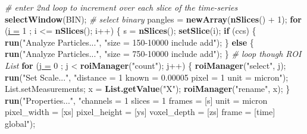 \documentclass[11pt,singlespacinge,twoside]{reedthesis} %
\newenvironment{Shaded}{}{}
\newcommand{\CommentTok}[1]{\textit{#1}}
\newcommand{\ControlFlowTok}[1]{\textbf{#1}}
\newcommand{\DataTypeTok}[1]{\underline{#1}}
\newcommand{\DecValTok}[1]{#1}
\newcommand{\KeywordTok}[1]{\textbf{#1}}
\newcommand{\NormalTok}[1]{#1}
\newcommand{\OperatorTok}[1]{#1}
\newcommand{\StringTok}[1]{#1}
\theoremstyle{definition}
\theoremstyle{definition}
\theoremstyle{definition}
\theoremstyle{remark}
\begin{document}
\begin{Shaded}
\begin{Highlighting}[numbers=left,,]
\CommentTok{# enter 2nd loop to increment over each slice of the time-series}
    \KeywordTok{selectWindow}\NormalTok{(BIN);   }\CommentTok{# select binary}
\NormalTok{    pangles =}\StringTok{ }\KeywordTok{newArray}\NormalTok{(}\KeywordTok{nSlices}\NormalTok{() }\OperatorTok{+}\StringTok{ }\DecValTok{1}\NormalTok{);}
    \ControlFlowTok{for}\NormalTok{ (}\DataTypeTok{i =} \DecValTok{1}\NormalTok{ ; i }\OperatorTok{<=}\StringTok{ }\KeywordTok{nSlices}\NormalTok{(); i}\OperatorTok{++}\NormalTok{) \{}
\NormalTok{      s =}\StringTok{ }\KeywordTok{nSlices}\NormalTok{();}
        \KeywordTok{setSlice}\NormalTok{(i);}
        \ControlFlowTok{if}\NormalTok{ (ccs) \{}
            \KeywordTok{run}\NormalTok{(}\StringTok{"Analyze Particles..."}\NormalTok{,}
                \StringTok{"size = 150-10000 include add"}\NormalTok{);}
\NormalTok{        \} }\ControlFlowTok{else}\NormalTok{ \{}
            \KeywordTok{run}\NormalTok{(}\StringTok{"Analyze Particles..."}\NormalTok{,}
                \StringTok{"size = 750-10000 include add"}\NormalTok{);}
\NormalTok{        \}}
    \CommentTok{# loop though ROI List}
        \ControlFlowTok{for}\NormalTok{ (}\DataTypeTok{j =} \DecValTok{0}\NormalTok{ ; j }\OperatorTok{<}\StringTok{ }\KeywordTok{roiManager}\NormalTok{(}\StringTok{"count"}\NormalTok{); j}\OperatorTok{++}\NormalTok{) \{}
            \KeywordTok{roiManager}\NormalTok{(}\StringTok{"select"}\NormalTok{, j);}
            \KeywordTok{run}\NormalTok{(}\StringTok{"Set Scale..."}\NormalTok{,}
                \StringTok{"distance = 1 known = 0.00005 pixel = 1 unit = micron"}\NormalTok{);}
\NormalTok{            List.setMeasurements;}
\NormalTok{            x =}\StringTok{ }\KeywordTok{List.getValue}\NormalTok{(}\StringTok{"X"}\NormalTok{);}
            \KeywordTok{roiManager}\NormalTok{(}\StringTok{"rename"}\NormalTok{, x);}
\NormalTok{        \}}
        \KeywordTok{run}\NormalTok{(}\StringTok{"Properties..."}\NormalTok{,}
            \StringTok{"channels = 1 slices = 1 frames = [s] unit = micron pixel_width = [xs]}
\StringTok{            pixel_height = [ys] voxel_depth = [zs] frame = [time] global"}\NormalTok{);}
        

\end{Highlighting}
\end{Shaded}
\end{document}
